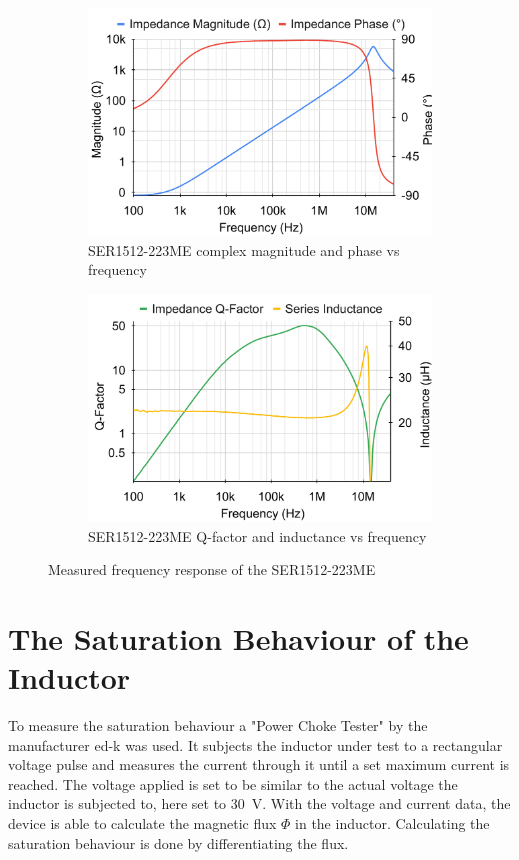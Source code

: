 \begin{figure}[H]
    \begin{subfigure}[b]{0.50\textwidth}
        \includegraphics[width=\textwidth]{Bilder/Kapitel3/SER223_BodePlot.pdf}
        \caption{SER1512-223ME complex magnitude and phase vs frequency}
    \end{subfigure}
    \begin{subfigure}[b]{0.50\textwidth}
        \includegraphics[width=\textwidth]{Bilder/Kapitel3/SER223_QLPlot.pdf}
        \caption{SER1512-223ME \ac{Q-factor} and inductance vs frequency}
    \end{subfigure}
    \caption{Measured frequency response of the SER1512-223ME}
    \label{fig:bode_100_measurements}							
\end{figure}
\section{The Saturation Behaviour of the Inductor} \label{sec:the_saturation_behaviour_of_the_inductor}
To measure the saturation behaviour a "Power Choke Tester" by the manufacturer ed-k was used. It subjects the inductor under test to a rectangular voltage pulse and measures the current through it until a set maximum current is reached. The voltage applied is set to be similar to the actual voltage the inductor is subjected to, here set to \SI{30}{V}. With the voltage and current data, the device is able to calculate the magnetic flux $\Phi$ in the inductor. Calculating the saturation behaviour is done by differentiating the flux.\\ 

